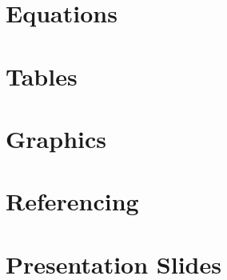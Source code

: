 \documentclass{article}
\begin{document}
\newpage

\section{Equations}

\section{Tables}

\section{Graphics}

\section{Referencing}

\section{Presentation Slides}
\end{document}
